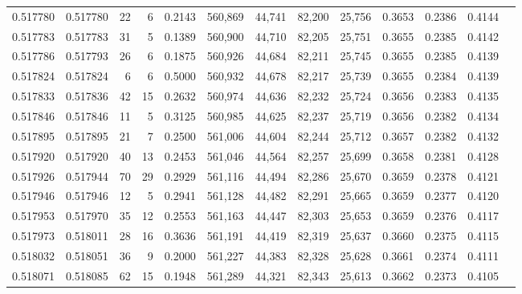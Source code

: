 \begin{tabular}{rrrrrrrrrrrrr}
0.517780 & 0.517780 &    22 &     6 &                                     0.2143 & 560,869 &  44,741 &  82,200 &  25,756 & 0.3653 & 0.2386 & 0.4144 \\
0.517783 & 0.517783 &    31 &     5 &                                     0.1389 & 560,900 &  44,710 &  82,205 &  25,751 & 0.3655 & 0.2385 & 0.4142 \\
0.517786 & 0.517793 &    26 &     6 &                                     0.1875 & 560,926 &  44,684 &  82,211 &  25,745 & 0.3655 & 0.2385 & 0.4139 \\
0.517824 & 0.517824 &     6 &     6 &                                     0.5000 & 560,932 &  44,678 &  82,217 &  25,739 & 0.3655 & 0.2384 & 0.4139 \\
0.517833 & 0.517836 &    42 &    15 &                                     0.2632 & 560,974 &  44,636 &  82,232 &  25,724 & 0.3656 & 0.2383 & 0.4135 \\
0.517846 & 0.517846 &    11 &     5 &                                     0.3125 & 560,985 &  44,625 &  82,237 &  25,719 & 0.3656 & 0.2382 & 0.4134 \\
0.517895 & 0.517895 &    21 &     7 &                                     0.2500 & 561,006 &  44,604 &  82,244 &  25,712 & 0.3657 & 0.2382 & 0.4132 \\
0.517920 & 0.517920 &    40 &    13 &                                     0.2453 & 561,046 &  44,564 &  82,257 &  25,699 & 0.3658 & 0.2381 & 0.4128 \\
0.517926 & 0.517944 &    70 &    29 &                                     0.2929 & 561,116 &  44,494 &  82,286 &  25,670 & 0.3659 & 0.2378 & 0.4121 \\
0.517946 & 0.517946 &    12 &     5 &                                     0.2941 & 561,128 &  44,482 &  82,291 &  25,665 & 0.3659 & 0.2377 & 0.4120 \\
0.517953 & 0.517970 &    35 &    12 &                                     0.2553 & 561,163 &  44,447 &  82,303 &  25,653 & 0.3659 & 0.2376 & 0.4117 \\
0.517973 & 0.518011 &    28 &    16 &                                     0.3636 & 561,191 &  44,419 &  82,319 &  25,637 & 0.3660 & 0.2375 & 0.4115 \\
0.518032 & 0.518051 &    36 &     9 &                                     0.2000 & 561,227 &  44,383 &  82,328 &  25,628 & 0.3661 & 0.2374 & 0.4111 \\
0.518071 & 0.518085 &    62 &    15 &                                     0.1948 & 561,289 &  44,321 &  82,343 &  25,613 & 0.3662 & 0.2373 & 0.4105 \\

\end{tabular}
